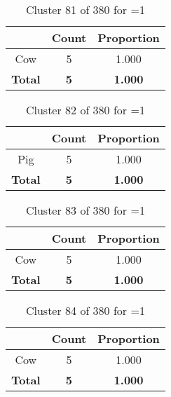 \begin{table}[ht!]
\centering
\begin{tabular}{|c|c|c|}
\hline
\bf \Spec{} &\bf Count &\bf Proportion\\ \hline \hline
Cow & 5 & 1.000\\ \hline
\hline
\bf Total & \bf 5 & \bf 1.000\\ \hline
\end{tabular}
\label{tab:cluster:81:1}
\caption{Cluster 81 of 380 for \minneigh{}=1}
\end{table}

\begin{table}[ht!]
\centering
\begin{tabular}{|c|c|c|}
\hline
\bf \Spec{} &\bf Count &\bf Proportion\\ \hline \hline
Pig & 5 & 1.000\\ \hline
\hline
\bf Total & \bf 5 & \bf 1.000\\ \hline
\end{tabular}
\label{tab:cluster:82:1}
\caption{Cluster 82 of 380 for \minneigh{}=1}
\end{table}

\begin{table}[ht!]
\centering
\begin{tabular}{|c|c|c|}
\hline
\bf \Spec{} &\bf Count &\bf Proportion\\ \hline \hline
Cow & 5 & 1.000\\ \hline
\hline
\bf Total & \bf 5 & \bf 1.000\\ \hline
\end{tabular}
\label{tab:cluster:83:1}
\caption{Cluster 83 of 380 for \minneigh{}=1}
\end{table}

\begin{table}[ht!]
\centering
\begin{tabular}{|c|c|c|}
\hline
\bf \Spec{} &\bf Count &\bf Proportion\\ \hline \hline
Cow & 5 & 1.000\\ \hline
\hline
\bf Total & \bf 5 & \bf 1.000\\ \hline
\end{tabular}
\label{tab:cluster:84:1}
\caption{Cluster 84 of 380 for \minneigh{}=1}
\end{table}


